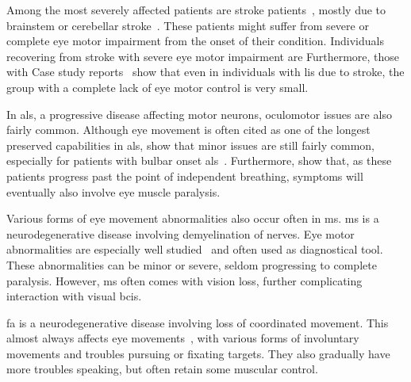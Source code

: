 \begin{table}
  
  \caption[Incidence of eye motor impairment in selected \acs{bci} target
    patient populations.]{%
      Incidence of eye motor impairment in selected \ac{bci} target
      patient populations. \acs{als}: \acl{als}, \acs{ms}: \acl{ms}, \acs{dmd}:
      \acl{dmd}, \acs{sma}: \acl{sma}, \acs{cp}: \acl{cp}, \acs{lis}: \acl{lis}.
      $+$: frequent, $-$: infrequent.
    }
    \label{tab:incidence}
\end{table}

Among the most  severely affected patients are stroke
patients~\cite{Pollock2011,Rowe2019}, mostly
due to brainstem or cerebellar stroke~\cite{Moncayo2009,Bogousslavsky1987}.
These patients might suffer from severe or complete eye motor impairment
from the onset of their condition.
Individuals recovering from stroke with severe eye motor impairment are
Furthermore, those with
Case study reports~\cite{Patterson1986,Graber2016} show that even in individuals
with \ac{lis} due to stroke, the group with a complete lack of eye motor
control is very small.

In \ac{als}, a progressive disease affecting motor neurons, oculomotor issues
are also fairly common.
Although eye movement is often cited as one of the longest preserved
capabilities in \ac{als}, show that minor issues are still
fairly common, especially for patients with bulbar onset
\ac{als}~\cite{Kang2018, Guo2022,Moss2012}.
Furthermore, \textcite{Hayashi1991} show that, as these patients progress past
the point of independent breathing, symptoms will eventually also involve
eye muscle paralysis.

Various forms of eye movement abnormalities also occur often in
\ac{ms}.
\ac{ms} is a neurodegenerative disease involving demyelination of nerves.
Eye motor abnormalities are especially well
studied~\cite{Mueri1985,Prasad2010,Castelnovo2016,Serra2018,Polet2020} and
often used as diagnostical tool.
These abnormalities can be minor or severe, seldom progressing to complete
paralysis.
However, \ac{ms} often comes with vision loss, further complicating interaction
with visual \acp{bci}.

\ac{fa} is a neurodegenerative disease involving loss of coordinated movement.
This almost always affects eye
movements~\cite{Fahey2008,Hocking2010,Furman1983}, with various forms of
involuntary movements and troubles pursuing or fixating targets.
They also gradually have more troubles speaking, but often retain some muscular
control.

